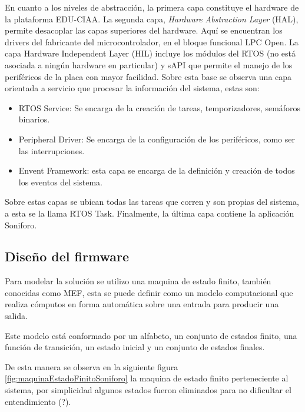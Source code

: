 En cuanto a los niveles de abstracción, la primera capa constituye el hardware de la plataforma EDU-CIAA. La segunda capa, \textit{Hardware Abstraction Layer} (HAL), permite desacoplar las capas superiores del hardware. Aquí se encuentran los
drivers del fabricante del microcontrolador, en el bloque funcional LPC Open. La capa Hardware Independent Layer (HIL) incluye los módulos del RTOS (no está asociada a ningún hardware en particular) y sAPI que permite el manejo de los periféricos de la placa con mayor facilidad.
Sobre esta base se observa una capa orientada a servicio que procesar la información del sistema, estas son: 
\begin{itemize}
\item RTOS Service: Se encarga de la creación de tareas, temporizadores, semáforos binarios.
\item Peripheral Driver: Se encarga de la configuración de los periféricos, como ser las interrupciones.
\item Envent Framework: esta capa se encarga de la definición y creación de todos los eventos del sistema.
\end{itemize}

Sobre estas capas se ubican todas las tareas que corren y son propias del sistema, a esta se la llama RTOS Task. Finalmente, la última capa contiene la aplicación Soniforo.

\subsection{Diseño del firmware}
Para modelar la solución se utilizo una maquina de estado finito, también conocidas como MEF, esta se puede definir como un modelo computacional que realiza cómputos en forma automática sobre una entrada para producir una salida.

Este modelo está conformado por un alfabeto, un conjunto de estados finito, una función de transición, un estado inicial y un conjunto de estados finales.

De esta manera se observa en la siguiente figura \ref{fig:maquinaEstadoFinitoSoniforo}  la maquina de estado finito perteneciente al sistema, por simplicidad algunos estados fueron eliminados para no dificultar el entendimiento (?).


